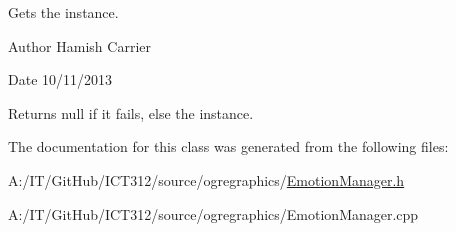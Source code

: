 Gets the instance. 

\begin{DoxyAuthor}{Author}
Hamish Carrier 
\end{DoxyAuthor}
\begin{DoxyDate}{Date}
10/11/2013
\end{DoxyDate}
\begin{DoxyReturn}{Returns}
null if it fails, else the instance. 
\end{DoxyReturn}


The documentation for this class was generated from the following files\-:\begin{DoxyCompactItemize}
\item 
A\-:/\-I\-T/\-Git\-Hub/\-I\-C\-T312/source/ogregraphics/\hyperlink{_emotion_manager_8h}{Emotion\-Manager.\-h}\item 
A\-:/\-I\-T/\-Git\-Hub/\-I\-C\-T312/source/ogregraphics/Emotion\-Manager.\-cpp\end{DoxyCompactItemize}
